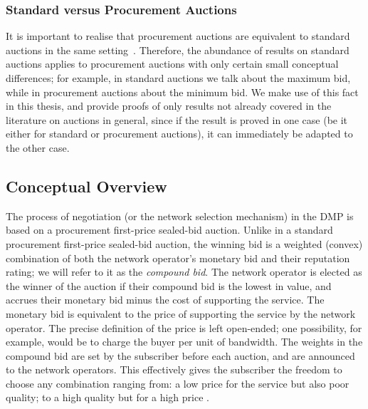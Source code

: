 \subsubsection{Standard versus Procurement Auctions} %
\label{ssub:standard_versus_procurement_auctions_dmp}
It is important to realise that procurement auctions are equivalent to standard auctions in the same setting~\cite{Krishna10}. Therefore, the abundance of results on standard auctions applies to procurement auctions with only certain small conceptual differences; for example, in standard auctions we talk about the maximum bid, while in procurement auctions about the minimum bid. We make use of this fact in this thesis, and provide proofs of only results not already covered in the literature on auctions in general, since if the result is proved in one case (be it either for standard or procurement auctions), it can immediately be adapted to the other case.

\subsection{Conceptual Overview} %
\label{sub:conceptual_overview_dmp}
The process of negotiation (or the network selection mechanism) in the DMP is based on a procurement first-price sealed-bid auction. Unlike in a standard procurement first-price sealed-bid auction, the winning bid is a weighted (convex) combination of both the network operator's monetary bid and their reputation rating; we will refer to it as the \emph{compound bid}. The network operator is elected as the winner of the auction if their compound bid is the lowest in value, and accrues their monetary bid minus the cost of supporting the service. The monetary bid is equivalent to the price of supporting the service by the network operator. The precise definition of the price is left open-ended; one possibility, for example, would be to charge the buyer per unit of bandwidth. The weights in the compound bid are set by the subscriber before each auction, and are announced to the network operators. This effectively gives the subscriber the freedom to choose any combination ranging from: a low price for the service but also poor quality; to a high quality but for a high price \cite{DMLeBodic00}.

